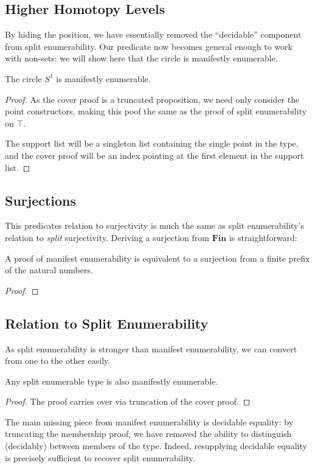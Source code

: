 \subsection{Higher Homotopy Levels}
By hiding the position, we have essentially removed the ``decidable'' component
from split enumerability.
Our predicate now becomes general enough to work with non-sets: we will show
here that the circle is manifestly enumerable.
\begin{theorem}
  The circle \(S^1\) is manifestly enumerable.
\end{theorem}
\begin{proof}
  As the cover proof is a truncated proposition, we need only consider the point
  constructors, making this poof the same as the proof of split enumerability on
  \(\top\).

  The support list will be a singleton list containing the single point in the
  type, and the cover proof will be an index pointing at the first element in
  the support list.

\end{proof}
\subsection{Surjections}
This predicates relation to surjectivity is much the same as split
enumerability's relation to \emph{split} surjectivity.
Deriving a surjection from \(\mathbf{Fin}\) is straightforward:
\begin{lemma}
  A proof of manifest enumerability is equivalent to a surjection from a finite
  prefix of the natural numbers.
\end{lemma}
\begin{proof}
\end{proof}
\subsection{Relation to Split Enumerability}
As split enumerability is stronger than manifest enumerability, we can convert
from one to the other easily.
\begin{lemma}
  Any split enumerable type is also manifestly enumerable.
\end{lemma}
\begin{proof}
  The proof carries over via truncation of the cover proof.
\end{proof}
The main missing piece from manifest enumerability is decidable equality: by
truncating the membership proof, we have removed the ability to distinguish
(decidably) between members of the type.
Indeed, resupplying decidable equality is precisely sufficient to recover split
enumerability.

